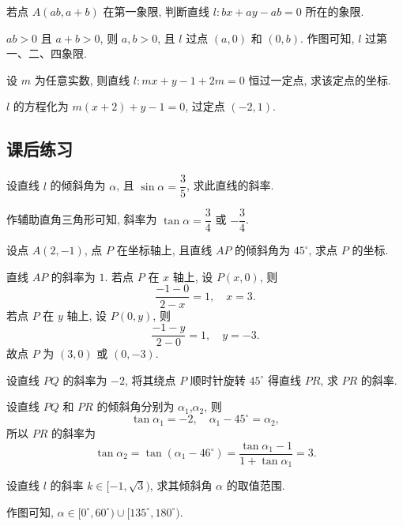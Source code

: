 \begin{exercise}
    若点 $A(ab, a+b)$ 在第一象限, 判断直线 $l\colon bx+ay-ab=0$ 所在的象限.
\end{exercise}
\beginsolution
    $ab>0$ 且 $a+b>0$, 则 $a,b>0$, 且 $l$ 过点 $(a,0)$ 和 $(0,b)$. 作图可知, $l$ 过第一、二、四象限. 
\endsolution

\begin{exercise}
    设 $m$ 为任意实数, 则直线 $l\colon mx+y-1+2m=0$ 恒过一定点, 求该定点的坐标.
\end{exercise}
\beginsolution
    $l$ 的方程化为 $m(x+2)+ y-1= 0$, 过定点 $(-2,1)$.
\endsolution

\subsection{课后练习}
\begin{exercise}
    设直线 $l$ 的倾斜角为 $\alpha$, 且 $\sin\alpha=\dfrac35$, 求此直线的斜率.
\end{exercise}
\beginsolution
    作辅助直角三角形可知, 斜率为 $\tan\alpha= \dfrac34$ 或 $-\dfrac34$.
\endsolution

\begin{exercise}
    设点 $A(2,-1)$, 点 $P$ 在坐标轴上, 且直线 $AP$ 的倾斜角为 $45^\circ$, 求点 $P$ 的坐标.
\end{exercise}
\beginsolution
    直线 $AP$ 的斜率为 $1$. 若点 $P$ 在 $x$ 轴上, 设 $P(x,0)$, 则
    \[\frac{-1-0}{2-x}= 1,\quad x=3.\]
    若点 $P$ 在 $y$ 轴上, 设 $P(0,y)$, 则
    \[\frac{-1-y}{2-0}= 1,\quad y= -3.\]
    故点 $P$ 为 $(3,0)$ 或 $(0,-3)$.
\endsolution

\begin{exercise}
    设直线 $PQ$ 的斜率为 $-2$, 将其绕点 $P$ 顺时针旋转 $45^\circ$ 得直线 $PR$, 求 $PR$ 的斜率.
\end{exercise}
\beginsolution
    设直线 $PQ$ 和 $PR$ 的倾斜角分别为 $\alpha_1$,$\alpha_2$, 则
    \[\tan\alpha_1= -2,\quad \alpha_1-45^\circ= \alpha_2,\]
    所以 $PR$ 的斜率为
    \[\tan\alpha_2= \tan(\alpha_1-46^\circ)
        = \frac{\tan\alpha_1- 1}{1+\tan\alpha_1}= 3.\]
\endsolution

\begin{exercise}
    设直线 $l$ 的斜率 $k\in[-1,\sqrt3)$, 求其倾斜角 $\alpha$ 的取值范围.
\end{exercise}
\beginsolution
    作图可知, $\alpha\in [0^\circ,60^\circ)\cup [135^\circ,180^\circ)$.
\endsolution

